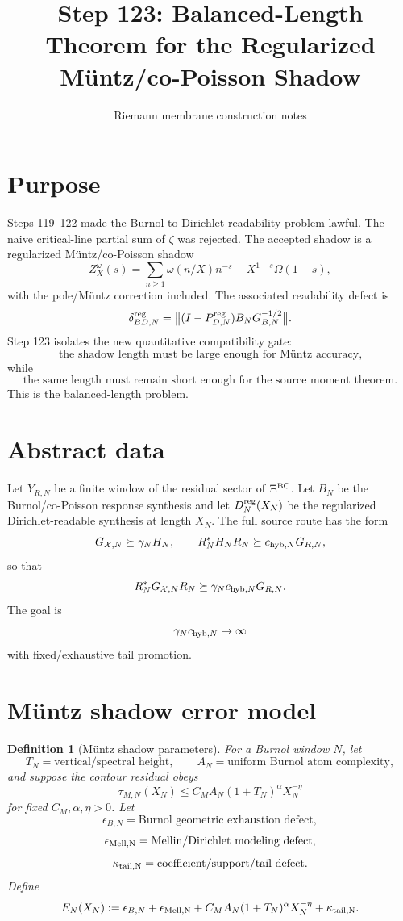 \documentclass[11pt]{article}
\title{Step 123: Balanced-Length Theorem for the Regularized Müntz/co-Poisson Shadow}
\author{Riemann membrane construction notes}
\date{}
\newtheorem{definition}{Definition}
\begin{document}
\maketitle

\section{Purpose}
Steps 119--122 made the Burnol-to-Dirichlet readability problem lawful.  The naive critical-line partial sum of \(\zeta\) was rejected.  The accepted shadow is a regularized Müntz/co-Poisson shadow
\[
Z_X^\omega(s)
=\sum_{n\ge 1}\omega(n/X)n^{-s}-X^{1-s}\Omega(1-s),
\]
with the pole/Müntz correction included.  The associated readability defect is
\[
\delta^{\rm reg}_{BD,N}
=\bigl\|(I-P^{\rm reg}_{D,N})B_NG_{B,N}^{-1/2}\bigr\|.
\]
Step 123 isolates the new quantitative compatibility gate:
\[
\text{the shadow length must be large enough for Müntz accuracy,}
\]
while
\[
\text{the same length must remain short enough for the source moment theorem.}
\]
This is the balanced-length problem.

\section{Abstract data}
Let \(Y_{R,N}\) be a finite window of the residual sector of \(\Xi^{\rm BC}\).  Let \(B_N\) be the Burnol/co-Poisson response synthesis and let \(D_N^{\rm reg}(X_N)\) be the regularized Dirichlet-readable synthesis at length \(X_N\).  The full source route has the form
\[
G_{\mathcal X,N}\succeq \gamma_N H_N,
\qquad
R_N^*H_NR_N\succeq c_{{\rm hyb},N}G_{R,N},
\]
so that
\[
R_N^*G_{\mathcal X,N}R_N\succeq \gamma_Nc_{{\rm hyb},N}G_{R,N}.
\]
The goal is
\[
\gamma_Nc_{{\rm hyb},N}\to\infty
\]
with fixed/exhaustive tail promotion.

\section{Müntz shadow error model}
\begin{definition}[Müntz shadow parameters]
For a Burnol window \(N\), let
\[
T_N = \text{vertical/spectral height},
\qquad
A_N = \text{uniform Burnol atom complexity},
\]
and suppose the contour residual obeys
\[
\tau_{M,N}(X_N)
\le C_M A_N(1+T_N)^\alpha X_N^{-\eta}
\]
for fixed \(C_M,\alpha,\eta>0\).  Let
\[
\epsilon_{B,N}=\text{Burnol geometric exhaustion defect},
\]
\[
\epsilon_{\rm Mell,N}=\text{Mellin/Dirichlet modeling defect},
\]
\[
\kappa_{\rm tail,N}=\text{coefficient/support/tail defect}.
\]
Define
\[
E_N(X_N):=
\epsilon_{B,N}+\epsilon_{\rm Mell,N}+C_MA_N(1+T_N)^\alpha X_N^{-\eta}+\kappa_{\rm tail,N}.
\]
\end{definition}
\end{document}
